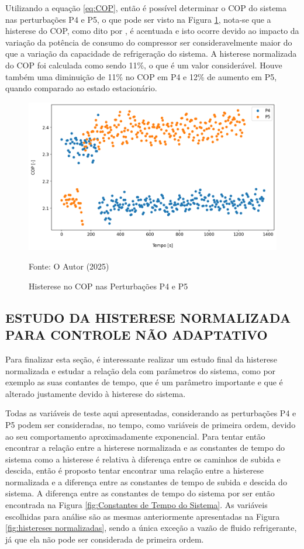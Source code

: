Utilizando a equação \ref{eq:COP}, então é possível determinar o COP do sistema nas perturbações P4 e P5, o que pode ser visto na Figura \ref{fig:Análise do COP Histerese}, nota-se que a histerese do COP, como dito por \textcite{MASCHE2021302}, é acentuada e isto ocorre devido ao impacto da variação da potência de consumo do compressor ser consideravelmente maior do que a variação da capacidade de refrigeração do sistema. A histerese normalizada do COP foi calculada como sendo 11\%, o que é um valor considerável. Houve também uma diminuição de 11\% no COP em P4 e 12\% de aumento em P5, quando comparado ao estado estacionário.
\newpage
\begin{figure}[h]
    \centering
    \includegraphics[width=1\linewidth]{FigurasdoTexto/COP Histerese.png}
    \caption{Histerese no COP nas Perturbações P4 e P5}
    \label{fig:Análise do COP Histerese}
    {\footnotesize Fonte: O Autor (2025)}
\end{figure}

\subsection{\MakeUppercase{Estudo da Histerese Normalizada para Controle Não Adaptativo}}

Para finalizar esta seção, é interessante realizar um estudo final da histerese normalizada e estudar a relação dela com parâmetros do sistema, como por exemplo as suas contantes de tempo, que é um parâmetro importante e que é alterado justamente devido à histerese do sistema.  

Todas as variáveis de teste aqui apresentadas, considerando as perturbações P4 e P5 podem ser consideradas, no tempo, como variáveis de primeira ordem, devido ao seu comportamento aproximadamente exponencial. Para tentar então encontrar a relação entre a histerese normalizada e as constantes de tempo do sistema como a histerese é relativa à diferença entre os caminhos de subida e descida, então é proposto tentar encontrar uma relação entre a histerese normalizada e a diferença entre as constantes de tempo de subida e descida do sistema.
\newpage
A diferença entre as constantes de tempo do sistema por ser então encontrada na Figura \ref{fig:Constantes de Tempo do Sistema}. As variáveis escolhidas para análise são as mesmas anteriormente apresentadas na Figura \ref{fig:histereses normalizadas}, sendo a única exceção a vazão de fluido refrigerante, já que ela não pode ser considerada de primeira ordem.


